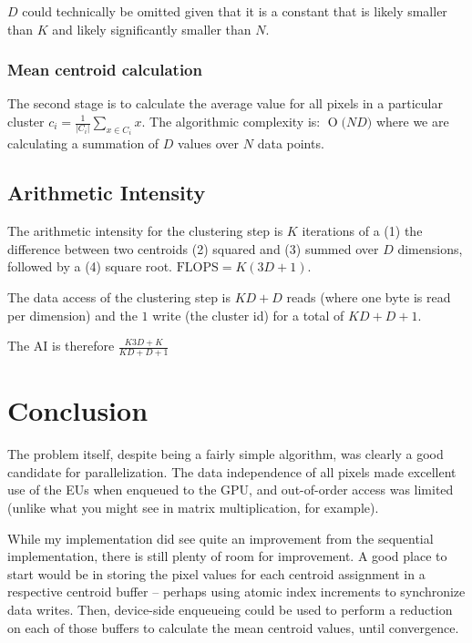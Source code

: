 \documentclass[11pt]{article}
\newcommand{\BigO}[1]{\ensuremath{\operatorname{O}\bigl(#1\bigr)}}
\begin{document}
$D$ could technically be omitted given that it is a constant that is likely smaller
than $K$ and likely significantly smaller than $N$.

\subsubsection{Mean centroid calculation}

The second stage is to calculate the average value for all pixels in a particular
cluster $c_i = \frac{1}{|C_i|}\sum_{x \in C_i}x$. The algorithmic complexity is: $\BigO{ND}$
where we are calculating a summation of $D$ values over $N$ data points.

\subsection{Arithmetic Intensity}

The arithmetic intensity for the clustering step is $K$ iterations of a (1) the difference
between two centroids (2) squared and (3) summed over $D$ dimensions, followed by a (4)
square root. $\text{FLOPS} = K(3D+1)$.

The data access of the clustering step is $KD+D$ reads (where one byte is read per dimension)
and the $1$ write (the cluster id) for a total of $KD+D+1$.

The AI is therefore $\frac{K3D+K}{KD+D+1}$

\section{Conclusion}

The problem itself, despite being a fairly simple algorithm, was clearly a good candidate for
parallelization. The data independence of all pixels made excellent use of the EUs when enqueued
to the GPU, and out-of-order access was limited (unlike what you might see in matrix multiplication,
for example).

While my implementation did see quite an improvement from the sequential implementation, there is still
plenty of room for improvement. A good place to start would be in storing the pixel values for each
centroid assignment in a respective centroid buffer -- perhaps using atomic index increments to synchronize
data writes. Then, device-side enqueueing could be used to perform a reduction on each of those buffers
to calculate the mean centroid values, until convergence.
\end{document}

